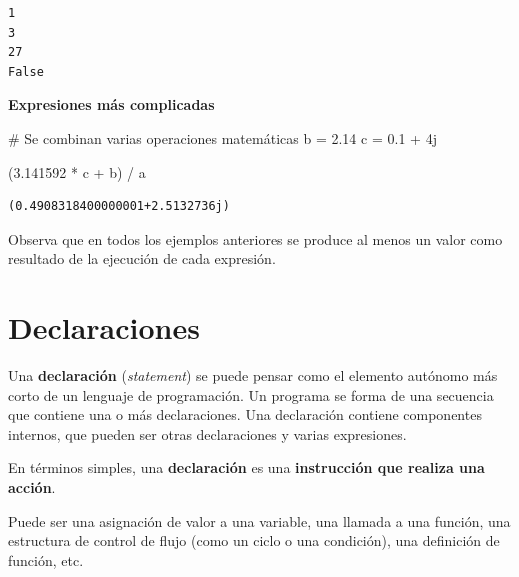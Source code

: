 \documentclass[
  spanish,
  letterpaper,
]{scrbook}
\newenvironment{Shaded}{\begin{snugshade}}{\end{snugshade}}
\newcommand{\CommentTok}[1]{\textcolor[rgb]{0.37,0.37,0.37}{#1}}
\newcommand{\FloatTok}[1]{\textcolor[rgb]{0.68,0.00,0.00}{#1}}
\newcommand{\NormalTok}[1]{\textcolor[rgb]{0.00,0.23,0.31}{#1}}
\newcommand{\OperatorTok}[1]{\textcolor[rgb]{0.37,0.37,0.37}{#1}}
\newcommand{\OtherTok}[1]{\textcolor[rgb]{0.00,0.23,0.31}{#1}}
\theoremstyle{definition}
\theoremstyle{remark}
\begin{document}
\begin{verbatim}
1
3
27
False
\end{verbatim}

\textbf{Expresiones más complicadas}

\begin{Shaded}
\begin{Highlighting}[]
\CommentTok{\# Se combinan varias operaciones matemáticas}
\NormalTok{b }\OperatorTok{=} \FloatTok{2.14}
\NormalTok{c }\OperatorTok{=} \FloatTok{0.1} \OperatorTok{+} \OtherTok{4j}

\NormalTok{(}\FloatTok{3.141592} \OperatorTok{*}\NormalTok{ c }\OperatorTok{+}\NormalTok{ b) }\OperatorTok{/}\NormalTok{ a}
\end{Highlighting}
\end{Shaded}

\begin{verbatim}
(0.4908318400000001+2.5132736j)
\end{verbatim}

Observa que en todos los ejemplos anteriores se produce al menos un
valor como resultado de la ejecución de cada expresión.

\section{Declaraciones}\label{declaraciones}

Una \textbf{declaración} (\emph{statement}) se puede pensar como el
elemento autónomo más corto de un lenguaje de programación. Un programa
se forma de una secuencia que contiene una o más declaraciones. Una
declaración contiene componentes internos, que pueden ser otras
declaraciones y varias expresiones.

\begin{tcolorbox}[enhanced jigsaw, colframe=quarto-callout-tip-color-frame, opacityback=0, toprule=.15mm, colback=white, coltitle=black, leftrule=.75mm, arc=.35mm, breakable, left=2mm, bottomtitle=1mm, rightrule=.15mm, bottomrule=.15mm, colbacktitle=quarto-callout-tip-color!10!white, toptitle=1mm, titlerule=0mm, opacitybacktitle=0.6, title=\textcolor{quarto-callout-tip-color}{\faLightbulb}\hspace{0.5em}{Tip}]

En términos simples, una \textbf{declaración} es una \textbf{instrucción
que realiza una acción}.

\end{tcolorbox}

Puede ser una asignación de valor a una variable, una llamada a una
función, una estructura de control de flujo (como un ciclo o una
condición), una definición de función, etc.
\end{document}
